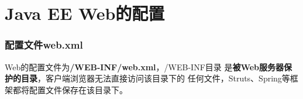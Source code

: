 
\section{Java EE Web的配置}

\begin{frame}[fragile] %
  \frametitle{配置文件web.xml} 

  Web的配置文件为{\bf\Red /WEB-INF/web.xml}，/WEB-INF目录
  是{\bf\Red 被Web服务器保护的目录}，客户端浏览器无法直接访问该目录下的
  任何文件，Struts、Spring等框架都将配置文件保存在该目录下。
\end{frame}

